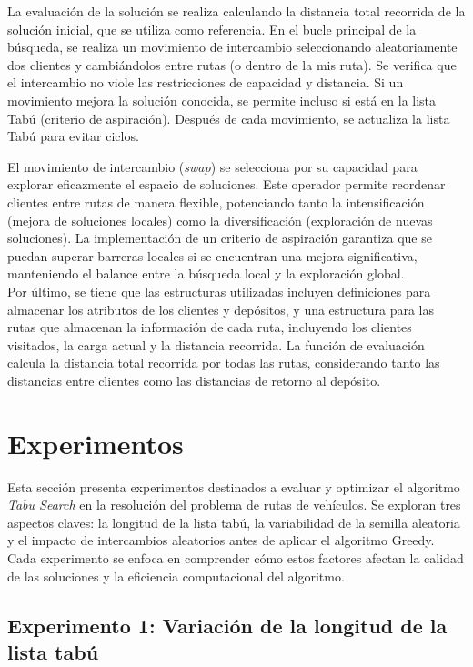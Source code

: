 \documentclass[letter, 10pt]{article}
\begin{document}
La evaluación de la solución se realiza calculando la distancia total recorrida de la solución inicial, que se utiliza como referencia. En el bucle principal de la búsqueda, se realiza un movimiento de intercambio seleccionando aleatoriamente dos clientes y cambiándolos entre rutas (o dentro de la mis ruta). Se verifica que el intercambio no viole las restricciones de capacidad y distancia. Si un movimiento mejora la solución conocida, se permite incluso si está en la lista Tabú (criterio de aspiración). Después de cada movimiento, se actualiza la lista Tabú para evitar ciclos.

El movimiento de intercambio (\textit{swap}) se selecciona por su capacidad para explorar eficazmente el espacio de soluciones. Este operador permite reordenar clientes entre rutas de manera flexible, potenciando tanto la intensificación (mejora de soluciones locales) como la diversificación (exploración de nuevas soluciones). La implementación de un criterio de aspiración garantiza que se puedan superar barreras locales si se encuentran una mejora significativa, manteniendo el balance entre la búsqueda local y la exploración global.\\

Por último, se tiene que las estructuras utilizadas incluyen definiciones para almacenar los atributos de los clientes y depósitos, y una estructura para las rutas que almacenan la información de cada ruta, incluyendo los clientes visitados, la carga actual y la distancia recorrida. La función de evaluación calcula la distancia total recorrida por todas las rutas, considerando tanto las distancias entre clientes como las distancias de retorno al depósito.

\section{Experimentos}

Esta sección presenta experimentos destinados a evaluar y optimizar el algoritmo \textit{Tabu Search} en la resolución del problema de rutas de vehículos. Se exploran tres aspectos claves: la longitud de la lista tabú, la variabilidad de la semilla aleatoria y el impacto de intercambios aleatorios antes de aplicar el algoritmo Greedy. Cada experimento se enfoca en comprender cómo estos factores afectan la calidad de las soluciones y la eficiencia computacional del algoritmo.

\subsection{Experimento 1: Variación de la longitud de la lista tabú}\label{Experimento1}
\end{document}
